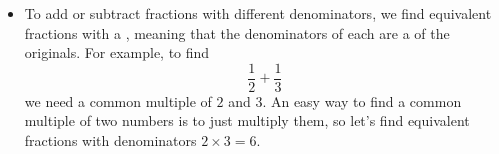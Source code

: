 \documentclass[12pt]{article}
\begin{document}
\begin{itemize}
\begin{center}
\end{center}
\vspace{-1em}
\item
To add or subtract fractions with different denominators, we find equivalent fractions  with a , meaning that the denominators of each are a  of the originals. For example, to find 
$$\frac{1}{2}+\frac{1}{3}$$ 
we need a common multiple of $2$ and $3$. An easy way to find a common multiple of two numbers is to just multiply them, so let's find equivalent fractions with denominators $2\times3 = 6$.


\end{itemize}
\end{document}
